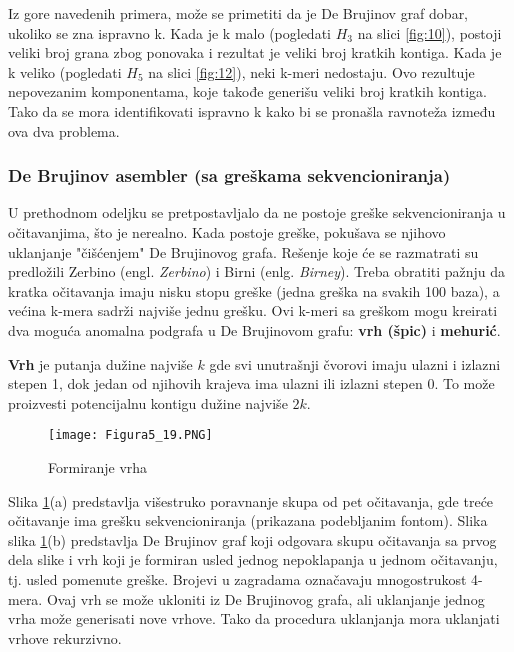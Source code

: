 \documentclass[12pt,oneside]{memoir}
\begin{document}
Iz gore navedenih primera, može se primetiti da je De Brujinov graf dobar, ukoliko se zna ispravno k. Kada je k malo (pogledati $H_3$ na slici \ref{fig:10}), postoji veliki broj grana zbog ponovaka i rezultat je veliki broj kratkih kontiga. Kada je k veliko (pogledati $H_5$ na slici \ref{fig:12}), neki k-meri nedostaju. Ovo rezultuje nepovezanim komponentama, koje takođe generišu veliki broj kratkih kontiga. Tako da se mora identifikovati ispravno k kako bi se pronašla ravnoteža između ova dva problema.

\subsubsection{De Brujinov asembler (sa greškama sekvencioniranja)}

U prethodnom odeljku se pretpostavljalo da ne postoje greške sekvencioniranja u očitavanjima, što je nerealno. Kada postoje greške, pokušava se njihovo uklanjanje "čišćenjem" De Brujinovog grafa. Rešenje koje će se razmatrati su predložili Zerbino (engl. \textit{Zerbino}) i Birni (enlg. \textit{Birney}). Treba obratiti pažnju da kratka očitavanja imaju nisku stopu greške (jedna greška na svakih 100 baza), a većina k-mera sadrži najviše jednu grešku. Ovi k-meri sa greškom mogu kreirati dva moguća anomalna podgrafa u De Brujinovom grafu: \textbf{vrh (špic)} i \textbf{mehurić}.

\textbf{Vrh} je putanja dužine najviše $k$ gde svi unutrašnji čvorovi imaju ulazni i izlazni stepen 1, dok jedan od njihovih krajeva ima ulazni ili izlazni stepen 0. To može proizvesti potencijalnu kontigu dužine najviše $2k$.

\begin{figure}[!ht]
\centering
\texttt{[image: Figura5\_19.PNG]}
\caption{Formiranje vrha}
\label{fig:13}
\end{figure}

Slika \ref{fig:13}(a) predstavlja višestruko poravnanje skupa od pet očitavanja, gde treće očitavanje ima grešku sekvencioniranja (prikazana podebljanim fontom). Slika slika \ref{fig:13}(b) predstavlja De Brujinov graf koji odgovara skupu očitavanja sa prvog dela slike i vrh koji je formiran usled jednog nepoklapanja u jednom očitavanju, tj. usled pomenute greške. Brojevi u zagradama označavaju mnogostrukost 4-mera. Ovaj vrh se može ukloniti iz De Brujinovog grafa, ali uklanjanje jednog vrha može generisati nove vrhove. Tako da procedura uklanjanja mora uklanjati vrhove rekurzivno.
\end{document}
